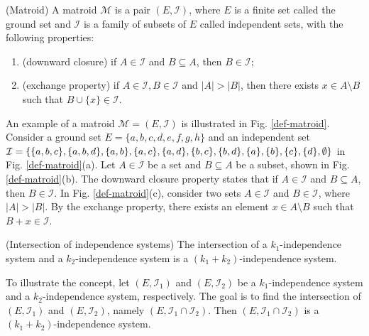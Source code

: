 \begin{definition} \label{def:matroid} (Matroid) \cite{nemhauser1978analysis}
A matroid $\mathcal{M}$ is a pair $(E, \mathcal{I})$, where $E$ is a finite set called the ground set and $\mathcal{I}$ is a family of subsets of $E$ called independent sets, with the following properties:
\begin{enumerate}
    \item (downward closure) if $A\in \mathcal{I}$ and $B \subseteq A$, then $B \in \mathcal{I}$;
    \item (exchange property) if $A \in \mathcal{I}, B\in \mathcal{I}$ and $|A|>|B|$, then there exists $x \in A\setminus B$ such that $B \cup \{x\} \in \mathcal{I}$.\\
\end{enumerate}
\end{definition}

An example of a matroid $\mathcal{M}=(E, \mathcal{I})$ is illustrated in Fig. \ref{def-matroid}.
Consider a ground set $E=\{a,b,c,d,e,f,g,h\}$ and an independent set $\mathcal{I}=\{\{a,b,c\}, \{a,b,d\}, \{a,b\}, \{a,c\}, \{a,d\}, \{b,c\}, \{b,d\}, \{a\}, \\ \{b\}, \{c\}, \{d\}, \emptyset \}$ in Fig. \ref{def-matroid}(a).
Let $A \in \mathcal{I}$ be a set and $B \subseteq A$ be a subset, shown in Fig. \ref{def-matroid}(b). The downward closure property states that if $A\in \mathcal{I}$ and $B \subseteq A$, then $B \in \mathcal{I}$. In Fig. \ref{def-matroid}(c), consider two sets $A \in \mathcal{I}$ and $B \in \mathcal{I}$, where $|A|>|B|$. By the exchange property, there exists an element $x \in A\setminus B$ such that $B+x \in \mathcal{I}$.\\

\begin{theorem} \label{thm:intersection-k-systems} (Intersection of independence systems) \cite{mestre2015intersection}
The intersection of a $k_1$-independence system and a $k_2$-independence system is a $(k_1 + k_2)$-independence system. \\
\end{theorem}

To illustrate the concept, let $(E, \mathcal{I}_1)$ and $(E, \mathcal{I}_2)$ be a $k_1$-independence system and a $k_2$-independence system, respectively.
The goal is to find the intersection of $(E, \mathcal{I}_1)$ and $(E, \mathcal{I}_2)$, namely $(E, \mathcal{I}_1 \cap \mathcal{I}_2)$. Then $(E, \mathcal{I}_1 \cap \mathcal{I}_2)$ is a $(k_1 + k_2)$-independence system. \\

